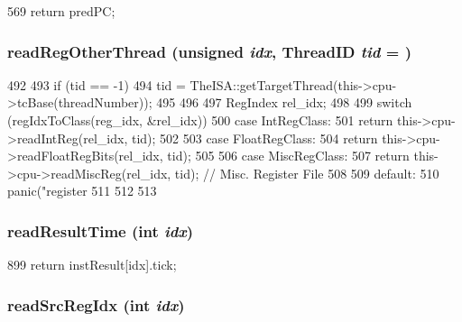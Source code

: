 \begin{DoxyCode}
569 { return predPC; }
\end{DoxyCode}
\hypertarget{classInOrderDynInst_a7aec440eccd01d839eee542413204f12}{
\subsubsection[{readRegOtherThread}]{ readRegOtherThread (unsigned {\em idx}, \/  {\bf ThreadID} {\em tid} = {})}}
\label{classInOrderDynInst_a7aec440eccd01d839eee542413204f12}



\begin{DoxyCode}
492 {
493     if (tid == -1) {
494         tid = TheISA::getTargetThread(this->cpu->tcBase(threadNumber));
495     }
496 
497     RegIndex rel_idx;
498 
499     switch (regIdxToClass(reg_idx, &rel_idx)) {
500       case IntRegClass:
501         return this->cpu->readIntReg(rel_idx, tid);
502 
503       case FloatRegClass:
504         return this->cpu->readFloatRegBits(rel_idx, tid);
505 
506       case MiscRegClass:
507         return this->cpu->readMiscReg(rel_idx, tid);  // Misc. Register File
508 
509       default:
510         panic("register %
511 
512     }
513 }
\end{DoxyCode}
\hypertarget{classInOrderDynInst_a171a5ef54c4a5e79154c185e58615e27}{
\subsubsection[{readResultTime}]{ readResultTime (int {\em idx})}}
\label{classInOrderDynInst_a171a5ef54c4a5e79154c185e58615e27}



\begin{DoxyCode}
899 { return instResult[idx].tick; }
\end{DoxyCode}
\hypertarget{classInOrderDynInst_aba797300f2818a94dc72addfafbb7c4b}{
\subsubsection[{readSrcRegIdx}]{ readSrcRegIdx (int {\em idx})}}
\label{classInOrderDynInst_aba797300f2818a94dc72addfafbb7c4b}



